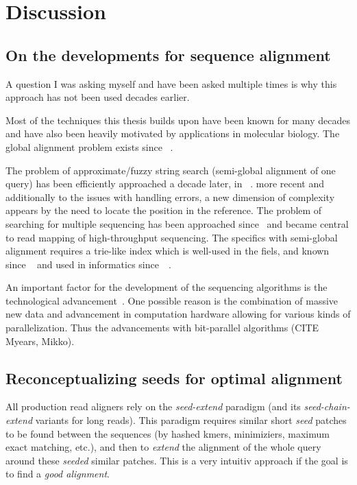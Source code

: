 \section{Discussion}

\subsection{On the developments for sequence alignment}
A question I was asking myself and have been asked multiple times is why this
approach has not been used decades earlier.

Most of the techniques this thesis builds upon have been known for many decades
and have also been heavily motivated by applications in molecular biology. The
global alignment problem exists since
\citeyear{vintsyuk1968speech}~\cite{vintsyuk1968speech,needleman1970general}.

The problem of approximate/fuzzy string search (semi-global alignment of one
query) has been efficiently approached a decade later, in
\citeyear{sellers1980theory}~\cite{sellers1980theory,smith1981identification}.
more recent and additionally to the issues with handling errors, a new dimension
of complexity appears by the need to locate the position in the reference. The
problem of searching for multiple sequencing has been approached
since\citeyear{pearson1988improved}~\cite{pearson1988improved} and became
central to read mapping of high-throughput sequencing. The specifics with
semi-global alignment requires a trie-like index which is well-used in the
fiels, and known since
\citeyear{thue1912gegenseitige}~\cite{thue1912gegenseitige} and used in
informatics since~\citeyear{de1959file}~\cite{de1959file}.

An important factor for the development of the sequencing algorithms is the
technological advancement~\cite{alser2021technology}. One possible reason is the
combination of massive new data and advancement in computation hardware allowing
for various kinds of parallelization. Thus the advancements with bit-parallel
algorithms (CITE Myears, Mikko).

\subsection{Reconceptualizing seeds for optimal alignment}

All production read aligners rely on the \emph{seed-extend} paradigm (and its
\emph{seed-chain-extend} variants for long reads). This paradigm requires
similar short \emph{seed} patches to be found between the sequences (\eg by
hashed kmers, minimiziers, maximum exact matching, etc.), and then to
\emph{extend} the alignment of the whole query around these \emph{seeded}
similar patches. This is a very intuitiv approach if the goal is to find a
\emph{good alignment}.

